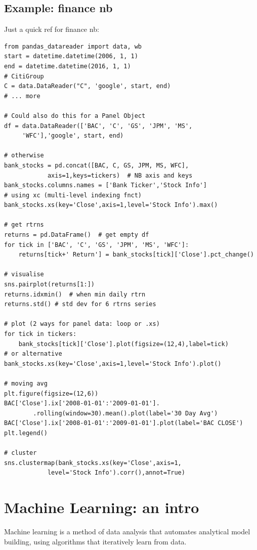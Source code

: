 \documentclass[11pt]{article}
\begin{document}
\subsection{Example: finance nb}
Just a quick ref for finance nb:
\begin{lstlisting}
from pandas_datareader import data, wb
start = datetime.datetime(2006, 1, 1)
end = datetime.datetime(2016, 1, 1)
# CitiGroup
C = data.DataReader("C", 'google', start, end)
# ... more

# Could also do this for a Panel Object
df = data.DataReader(['BAC', 'C', 'GS', 'JPM', 'MS',
	 'WFC'],'google', start, end)

# otherwise
bank_stocks = pd.concat([BAC, C, GS, JPM, MS, WFC],
			axis=1,keys=tickers)  # NB axis and keys
bank_stocks.columns.names = ['Bank Ticker','Stock Info']
# using xc (multi-level indexing fnct)
bank_stocks.xs(key='Close',axis=1,level='Stock Info').max()

# get rtrns
returns = pd.DataFrame()  # get empty df
for tick in ['BAC', 'C', 'GS', 'JPM', 'MS', 'WFC']:  
	returns[tick+' Return'] = bank_stocks[tick]['Close'].pct_change()

# visualise
sns.pairplot(returns[1:])
returns.idxmin()  # when min daily rtrn
returns.std() # std dev for 6 rtrns series

# plot (2 ways for panel data: loop or .xs)
for tick in tickers:
	bank_stocks[tick]['Close'].plot(figsize=(12,4),label=tick)
# or alternative
bank_stocks.xs(key='Close',axis=1,level='Stock Info').plot()

# moving avg
plt.figure(figsize=(12,6))
BAC['Close'].ix['2008-01-01':'2009-01-01'].
		.rolling(window=30).mean().plot(label='30 Day Avg')
BAC['Close'].ix['2008-01-01':'2009-01-01'].plot(label='BAC CLOSE')
plt.legend()

# cluster
sns.clustermap(bank_stocks.xs(key='Close',axis=1,
			level='Stock Info').corr(),annot=True)
\end{lstlisting}

\section{Machine Learning: an intro} \label{sec:Machine}
Machine learning is a method of data analysis that automates analytical model building, using algorithms that iteratively learn from data.
\end{document}
